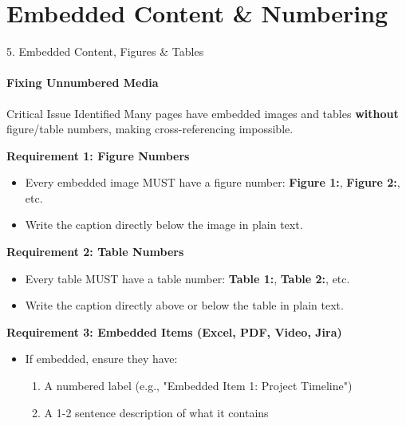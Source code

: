 \documentclass[10pt, aspectratio=169]{beamer}
\begin{document}
	\section{Embedded Content \& Numbering}
	\begin{frame}{5. Embedded Content, Figures \& Tables}
		\framesubtitle{Fixing Unnumbered Media}
		\begin{block}{Critical Issue Identified}
			Many pages have embedded images and tables \textbf{without} figure/table numbers, making cross-referencing impossible.
		\end{block}
		
		\pause
		\textbf{Requirement 1: Figure Numbers}
		\begin{itemize}
			\item Every embedded image MUST have a figure number: \textbf{Figure 1:}, \textbf{Figure 2:}, etc.
			\item Write the caption directly below the image in plain text.
		\end{itemize}
		\pause
		
		\textbf{Requirement 2: Table Numbers}
		\begin{itemize}
			\item Every table MUST have a table number: \textbf{Table 1:}, \textbf{Table 2:}, etc.
			\item Write the caption directly above or below the table in plain text.
		\end{itemize}
		\pause
		
		\textbf{Requirement 3: Embedded Items (Excel, PDF, Video, Jira)}
		\begin{itemize}
			\item If embedded, ensure they have:
			\begin{enumerate}
				\item A numbered label (e.g., "Embedded Item 1: Project Timeline")
				\item A 1-2 sentence description of what it contains
			\end{enumerate}
		\end{itemize}
	\end{frame}
	
\end{document}
